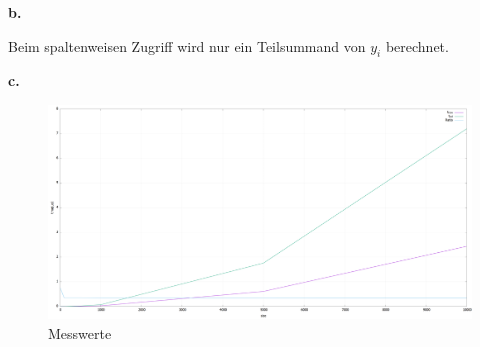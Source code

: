 \documentclass[12pt]{article}
\begin{document}
\noindent \textbf{b.}

Beim spaltenweisen Zugriff wird nur ein Teilsummand von $y_i$ berechnet.


\noindent \textbf{c.}

\begin{figure}[ht]
	\centering
	\includegraphics[width=0.9\linewidth]{../plot}
	\caption[Messwerte]{Messwerte}
	\label{fig:plot}
\end{figure}
\end{document}

